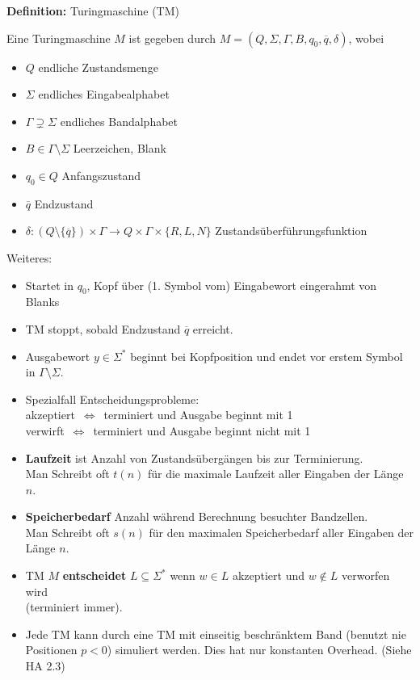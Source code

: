 \documentclass[a4paper,graphics,11pt]{article}
\newcommand{\Iff}[0]{\,\Longleftrightarrow\,}
\begin{document}
\strut

\textbf{Definition:} Turingmaschine (TM)

Eine Turingmaschine $M$ ist gegeben durch $M = (Q, \Sigma, \Gamma, B, q_0, \overline{q}, \delta)$, wobei
\begin{itemize}
    \item $Q$ endliche Zustandsmenge
    \item $\Sigma$ endliches Eingabealphabet
    \item $\Gamma \supsetneq \Sigma$ endliches Bandalphabet
    \item $B \in \Gamma \setminus \Sigma$ Leerzeichen, Blank
    \item $q_0 \in Q$ Anfangszustand
    \item $\overline{q}$ Endzustand
    \item $\delta : (Q \setminus \{\overline{q}\}) \times \Gamma \to Q \times \Gamma \times \{R, L, N\}$
        Zustandsüberführungsfunktion
\end{itemize}

Weiteres:
\begin{itemize}
    \item Startet in $q_0$, Kopf über (1. Symbol vom) Eingabewort eingerahmt von Blanks
    \item TM stoppt, sobald Endzustand $\overline{q}$ erreicht.
    \item Ausgabewort $y \in \Sigma^*$ beginnt bei Kopfposition und endet vor erstem Symbol in $\Gamma\setminus\Sigma$.
    \\
    \item Spezialfall Entscheidungsprobleme:\\
        akzeptiert $\Iff$ terminiert und Ausgabe beginnt mit 1\\
        verwirft $\Iff$ terminiert und Ausgabe beginnt nicht mit 1
    \item \textbf{Laufzeit} ist Anzahl von Zustandsübergängen bis zur Terminierung.\\
        Man Schreibt oft $t(n)$ für die maximale Laufzeit aller Eingaben der Länge $n$.
    \item \textbf{Speicherbedarf} Anzahl während Berechnung besuchter Bandzellen.\\
        Man Schreibt oft $s(n)$ für den maximalen Speicherbedarf aller Eingaben der Länge $n$.
    \\
    \item TM $M$ \textbf{entscheidet} $L \subseteq \Sigma^*$ wenn $w \in L$ akzeptiert und $w\notin L$ verworfen wird\\
        (terminiert immer).
    \\
    \item Jede TM kann durch eine TM mit einseitig beschränktem Band (benutzt nie Positionen $p<0$) simuliert werden.
        Dies hat nur konstanten Overhead. (Siehe HA 2.3)
\end{itemize}
\strut
\end{document}
